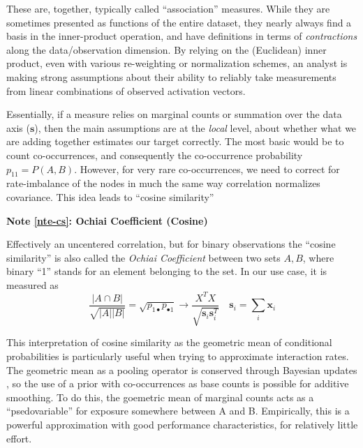 \documentclass[%
	12pt,
		oneside,
		letterpaper
]{book}
\newcounter{quartocalloutnteno}
\newcommand{\quartocalloutnte}[1]{\refstepcounter{quartocalloutnteno}\label{#1}}
\begin{document}
These are, together, typically called ``association'' measures. While
they are sometimes presented as functions of the entire dataset, they
nearly always find a basis in the inner-product operation, and have
definitions in terms of \emph{contractions} along the data/observation
dimension. By relying on the (Euclidean) inner product, even with
various re-weighting or normalization schemes, an analyst is making
strong assumptions about their ability to reliably take measurements
from linear combinations of observed activation vectors.

Essentially, if a measure relies on marginal counts or summation over
the data axis (\(\mathbf{s}\)), then the main assumptions are at the
\emph{local} level, about whether what we are adding together estimates
our target correctly. The most basic would be to count co-occurrences,
and consequently the co-occurrence probability \(p_{11}=P(A,B)\).
However, for very rare co-occurrences, we need to correct for
rate-imbalance of the nodes in much the same way correlation normalizes
covariance. This idea leads to ``cosine similarity''

\begin{tcolorbox}[enhanced jigsaw, colback=white, arc=.35mm, toprule=.15mm, opacityback=0, colframe=quarto-callout-note-color-frame, bottomrule=.15mm, rightrule=.15mm, leftrule=.75mm, left=2mm, breakable]

\quartocalloutnte{nte-cs} 

\vspace{-3mm}\textbf{Note \ref*{nte-cs}: Ochiai Coefficient (Cosine)}\vspace{3mm}

Effectively an uncentered correlation, but for binary observations the
``cosine similarity'' is also called the \emph{Ochiai Coefficient}
between two sets \(A,B\), where binary ``1'' stands for an element
belonging to the set.\autocite{Measuresecologicalassociation_Janson1981}
In our use case, it is measured as \[
\frac{|A \cap B |}{\sqrt{|A||B|}}=\sqrt{p_{1\bullet}p_{\bullet 1}} \rightarrow  \frac{X^TX}{\sqrt{\mathbf{s}_i\mathbf{s}_i^T}}\quad \mathbf{s}_i = \sum_i \mathbf{x}_i
\]

\end{tcolorbox}

This interpretation of cosine similarity as the geometric mean of
conditional probabilities is particularly useful when trying to
approximate interaction rates. The geometric mean as a pooling operator
is conserved through Bayesian updates
\autocite{ProbabilityAggregationMethods_Allard2012}, so the use of a
prior with co-occurrences as base counts is possible for additive
smoothing. To do this, the goemetric mean of marginal counts acts as a
``psedovariable'' for exposure somewhere between A and B. Empirically,
this is a powerful approximation with good performance characteristics,
for relatively little effort.
\end{document}

